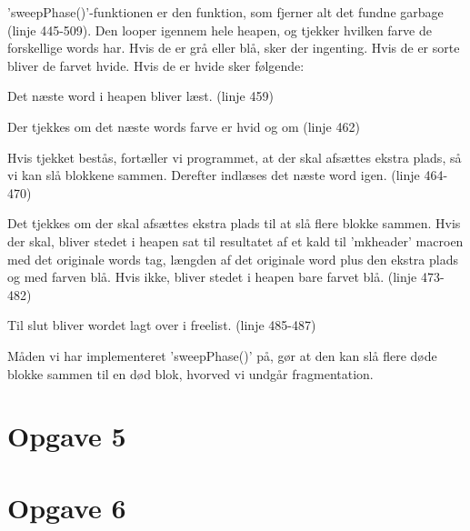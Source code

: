 'sweepPhase()'-funktionen er den funktion, som fjerner alt det fundne garbage (linje 445-509). Den looper igennem hele heapen, og tjekker hvilken farve de forskellige words har. Hvis de er grå eller blå, sker der ingenting. Hvis de er sorte bliver de farvet hvide. Hvis de er hvide sker følgende:
\begin{my_enumerate}
	\item Det næste word i heapen bliver læst. (linje 459)
	\item Der tjekkes om det næste words farve er hvid og om (linje 462) %
	\item Hvis tjekket bestås, fortæller vi programmet, at der skal afsættes ekstra plads, så vi kan slå blokkene sammen. Derefter indlæses det næste word igen. (linje 464-470)
	\item Det tjekkes om der skal afsættes ekstra plads til at slå flere blokke sammen. Hvis der skal, bliver stedet i heapen sat til resultatet af et kald til 'mkheader' macroen med det originale words tag, længden af det originale word plus den ekstra plads og med farven blå. Hvis ikke, bliver stedet i heapen bare farvet blå. (linje 473-482)
	\item Til slut bliver wordet lagt over i freelist. (linje 485-487)
\end{my_enumerate}

Måden vi har implementeret 'sweepPhase()' på, gør at den kan slå flere døde blokke sammen til en død blok, hvorved vi undgår fragmentation.

\section{Opgave 5}
\label{O5}

\section{Opgave 6}
\label{O6}
